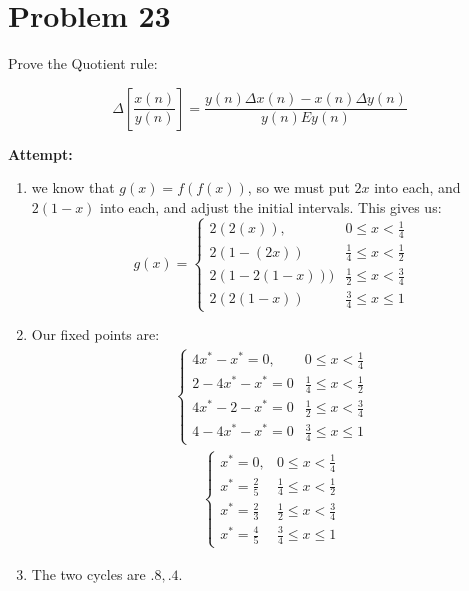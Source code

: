 \documentclass[12pt,letterpaper]{article}
\theoremstyle{definition}
\begin{document}
\section*{Problem 23}

Prove the Quotient rule:

\begin{equation*}
    \Delta\left[\frac{x(n)}{y(n)}\right] = \frac{y(n)\Delta x(n) - x(n) \Delta y(n)}{y(n)Ey(n)}
\end{equation*}



\textbf{Attempt:}

    \begin{changemargin}{.5cm}{0cm}
        \begin{enumerate}[label=(\alph*)]
    \item
    we know that $g(x) = f(f(x))$, so we must put $2x$ into each, and $2(1-x)$ into each, and adjust the initial intervals. This gives us: \begin{equation*}
        g(x) = \begin{cases}
         2(2(x)), & 0\leq x < \frac 1 4\\
         2(1-(2x)) & \frac 1 4 \leq x < \frac 1 2 \\
         2(1-2(1-x))) & \frac 1 2 \leq x < \frac 3 4\\
         2(2(1-x)) & \frac 3 4 \leq x \leq 1
        \end{cases}
    \end{equation*}
    
    
    \item Our fixed points are:
    \begin{align*}
         \begin{cases}
         4x^*-x^*=0, & 0\leq x < \frac 1 4\\
         2-4x^* - x^* = 0 & \frac 1 4 \leq x < \frac 1 2 \\
         4x^*-2 - x^*=0 & \frac 1 2 \leq x < \frac 3 4\\
         4-4x^* -x^*=0 & \frac 3 4 \leq x \leq 1
        \end{cases}
    \end{align*}
    \begin{align*}
         \begin{cases}
         x^*=0, & 0\leq x < \frac 1 4\\
         x^*=\frac 2 5 & \frac 1 4 \leq x < \frac 1 2 \\
         x^*=\frac 2 3  & \frac 1 2 \leq x < \frac 3 4\\
         x^* = \frac 4 5  & \frac 3 4 \leq x \leq 1
        \end{cases}
    \end{align*}
    \item The two cycles are $.8,.4$.
    
\end{enumerate}

    \end{changemargin}
\end{document}
